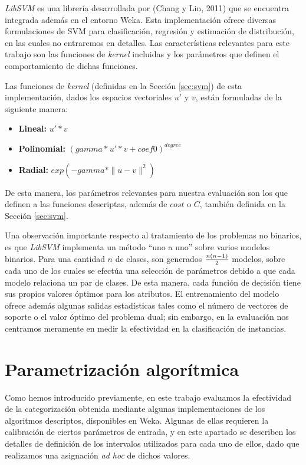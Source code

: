 \textit{LibSVM} es una librer\'ia desarrollada por (Chang y Lin, 2011) que se encuentra integrada adem\'as en el entorno Weka. Esta implementaci\'on ofrece diversas formulaciones de SVM para clasificaci\'on, regresi\'on y estimaci\'on de distribuci\'on, en las cuales no entraremos en detalles. Las caracter\'isticas relevantes para este trabajo son las funciones de \textit{kernel} incluidas y los par\'ametros que definen el comportamiento de dichas funciones.
\newline

Las funciones de \textit{kernel} (definidas en la Secci\'on \ref{sec:svm}) de esta implementaci\'on, dados los espacios vectoriales $u'$ y $v$, est\'an formuladas de la siguiente manera:
\begin{itemize}
\item \textbf{Lineal:} $u'*v$
\item \textbf{Polinomial:} $(gamma*u'*v + coef0)^{degree}$ 
\item \textbf{Radial:} $exp(-gamma*\|u-v\|^{2})$
\end{itemize}

De esta manera, los par\'ametros relevantes para nuestra evaluaci\'on son los que definen a las funciones descriptas, adem\'as de $cost$ o $C$, tambi\'en definida en la Secci\'on \ref{sec:svm}.
\newline

Una observaci\'on importante respecto al tratamiento de los problemas no binarios, es que \textit{LibSVM} implementa un m\'etodo ``uno a uno'' sobre varios modelos binarios. Para una cantidad $n$ de clases, son generados $n(n-1) \over 2$ modelos, sobre cada uno de los cuales se efect\'ua una selecci\'on de par\'ametros debido a que cada modelo relaciona un par de clases. De esta manera, cada funci\'on de decisi\'on tiene sus propios valores \'optimos para los atributos. El entrenamiento del modelo ofrece adem\'as algunas salidas estad\'isticas tales como el n\'umero de vectores de soporte o el valor \'optimo del problema dual; sin embargo, en la evaluaci\'on nos centramos meramente en medir la efectividad en la clasificaci\'on de instancias.

\section{Parametrizaci\'on algor\'itmica}

Como hemos introducido previamente, en este trabajo evaluamos la efectividad de la categorizaci\'on obtenida mediante algunas implementaciones de los algoritmos descriptos, disponibles en Weka. Algunas de ellas requieren la calibraci\'on de ciertos par\'ametros de entrada, y en este apartado se describen los detalles de definici\'on de los intervalos utilizados para cada uno de ellos, dado que realizamos una asignaci\'on \textit{ad hoc} de dichos valores.
\newline

